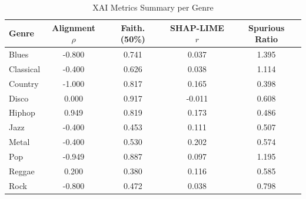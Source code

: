 \begin{table}[htbp]
\caption{XAI Metrics Summary per Genre}
\label{tab:xai_summary}
\centering
\begin{tabular}{lcccc}
\toprule
Genre & Alignment $\rho$ & Faith. (50\%) & SHAP-LIME $r$ & Spurious Ratio \\
\midrule
Blues & -0.800 & 0.741 & 0.037 & 1.395 \\
Classical & -0.400 & 0.626 & 0.038 & 1.114 \\
Country & -1.000 & 0.817 & 0.165 & 0.398 \\
Disco & 0.000 & 0.917 & -0.011 & 0.608 \\
Hiphop & 0.949 & 0.819 & 0.173 & 0.486 \\
Jazz & -0.400 & 0.453 & 0.111 & 0.507 \\
Metal & -0.400 & 0.530 & 0.202 & 0.574 \\
Pop & -0.949 & 0.887 & 0.097 & 1.195 \\
Reggae & 0.200 & 0.380 & 0.116 & 0.585 \\
Rock & -0.800 & 0.472 & 0.038 & 0.798 \\
\bottomrule
\end{tabular}
\end{table}